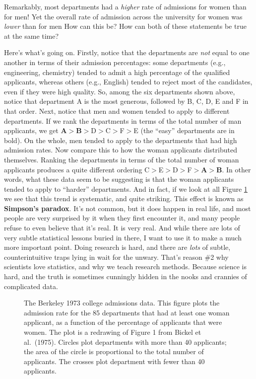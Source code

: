 \documentclass[
]{book}
\makeatletter
\newcommand*\pandocbounded[1]{%
  \sbox\pandoc@box{#1}%
  \Gscale@div\@tempa{\textheight}{\dimexpr\ht\pandoc@box+\dp\pandoc@box\relax}%
  \Gscale@div\@tempb{\linewidth}{\wd\pandoc@box}%
  \ifdim\@tempb\p@<\@tempa\p@\let\@tempa\@tempb\fi%
  \ifdim\@tempa\p@<\p@\scalebox{\@tempa}{\usebox\pandoc@box}%
  \else\usebox{\pandoc@box}%
  \fi%
}
\makeatother
\begin{document}
Remarkably, most departments had a \emph{higher} rate of admissions for women than for men! Yet the overall rate of admission across the university for women was \emph{lower} than for men How can this be? How can both of these statements be true at the same time?

Here's what's going on. Firstly, notice that the departments are \emph{not} equal to one another in terms of their admission percentages: some departments (e.g., engineering, chemistry) tended to admit a high percentage of the qualified applicants, whereas others (e.g., English) tended to reject most of the candidates, even if they were high quality. So, among the six departments shown above, notice that department A is the most generous, followed by B, C, D, E and F in that order. Next, notice that men and women tended to apply to different departments. If we rank the departments in terms of the total number of man applicants, we get \textbf{A}\(>\)\textbf{B}\(>\)D\(>\)C\(>\)F\(>\)E (the ``easy'' departments are in bold). On the whole, men tended to apply to the departments that had high admission rates. Now compare this to how the woman applicants distributed themselves. Ranking the departments in terms of the total number of woman applicants produces a quite different ordering C\(>\)E\(>\)D\(>\)F\(>\)\textbf{A}\(>\)\textbf{B}. In other words, what these data seem to be suggesting is that the woman applicants tended to apply to ``harder'' departments. And in fact, if we look at all Figure \ref{fig:1simpson} we see that this trend is systematic, and quite striking. This effect is known as \textbf{Simpson's paradox}. It's not common, but it does happen in real life, and most people are very surprised by it when they first encounter it, and many people refuse to even believe that it's real. It is very real. And while there are lots of very subtle statistical lessons buried in there, I want to use it to make a much more important point. Doing research is hard, and there are \emph{lots} of subtle, counterintuitive traps lying in wait for the unwary. That's reason \#2 why scientists love statistics, and why we teach research methods. Because science is hard, and the truth is sometimes cunningly hidden in the nooks and crannies of complicated data.

\begin{figure}
\centering
\pandocbounded{\texttt{[image: figures/1Simpson.png]}}
\caption{\label{fig:1simpson}The Berkeley 1973 college admissions data. This figure plots the admission rate for the 85 departments that had at least one woman applicant, as a function of the percentage of applicants that were women. The plot is a redrawing of Figure 1 from Bickel et al.~(1975). Circles plot departments with more than 40 applicants; the area of the circle is proportional to the total number of applicants. The crosses plot department with fewer than 40 applicants.}
\end{figure}
\end{document}
